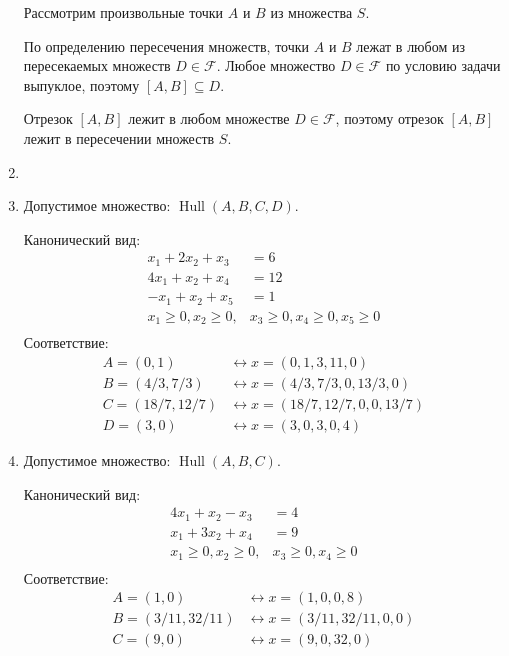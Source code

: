 \documentclass[12pt]{article}
\newcommand{\cF}{\mathcal{F}}
\DeclareMathOperator{\Hull}{Hull}
\DeclareMathOperator{\hull}{\Hull}
\begin{document}
\begin{enumerate}
Рассмотрим произвольные точки $A$ и $B$ из множества $S$. 

По определению пересечения множеств, точки $A$ и $B$ лежат в любом из пересекаемых множеств $D \in \cF$. 
Любое множество $D \in \cF$ по условию задачи выпуклое, поэтому $[A, B] \subseteq D$.

Отрезок $[A, B]$ лежит в любом множестве $D \in \cF$, поэтому отрезок $[A, B]$ лежит в пересечении множеств $S$.

\item 

\item %
Допустимое множество: $\hull(A, B, C, D)$.


Канонический вид:
\begin{align*}
  x_1 + 2x_2 + x_3 &= 6 \\
  4x_1 + x_2 + x_4 &= 12 \\
  -x_1 + x_2 + x_5 &= 1 \\
  x_1 \geq 0, x_2 \geq 0,& x_3 \geq 0, x_4 \geq 0, x_5 \geq 0 \\
\end{align*}
%
Соответствие:
\begin{align*}
  A = (0, 1) &\leftrightarrow x= (0, 1, 3, 11, 0) \\
  B = (4/3, 7/3) &\leftrightarrow x = (4/3, 7/3, 0, 13/3, 0) \\
  C = (18/7, 12/7) &\leftrightarrow x = (18/7, 12/7, 0, 0, 13/7) \\
  D = (3, 0) &\leftrightarrow x = (3, 0, 3, 0, 4)    
\end{align*}

\item %
Допустимое множество: $\hull(A, B, C)$.

Канонический вид:
\begin{align*}
  4x_1 + x_2 - x_3 &= 4 \\
  x_1 + 3x_2 + x_4 &= 9 \\
  x_1 \geq 0, x_2 \geq 0,& x_3 \geq 0, x_4 \geq 0 \\
\end{align*}
%
Соответствие:
\begin{align*}
  A = (1, 0) &\leftrightarrow x = (1, 0, 0, 8) \\
  B = (3/ 11, 32/11) &\leftrightarrow x = (3/11, 32/11, 0, 0) \\
  C = (9, 0) &\leftrightarrow x = (9, 0, 32, 0)
\end{align*}

\end{enumerate}
\end{document}
